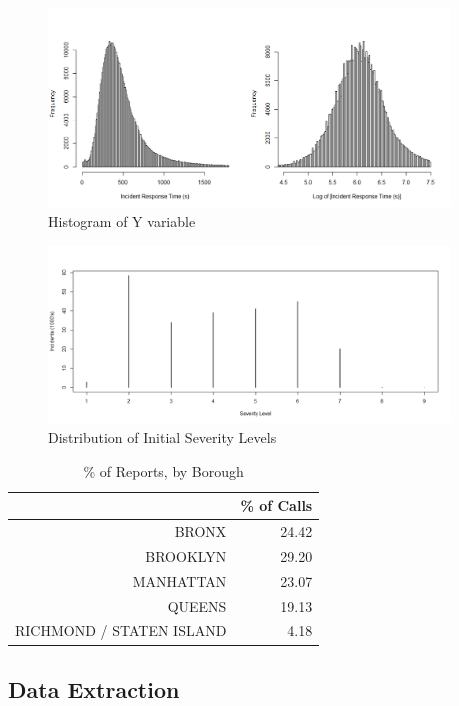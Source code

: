 \documentclass[twoside,11pt]{article}
\begin{document}
\setlength{\tabcolsep}{4pt}

\begin{figure}
    \centering
    \includegraphics[width = 0.95\textwidth]{hist1.png}
    \caption{Histogram of Y variable}
    \label{fig:my_label}
\end{figure}

\begin{figure}
    \centering
    \includegraphics[width = 0.95\textwidth]{severity.png}
    \caption{Distribution of Initial Severity Levels}
\end{figure}

\begin{table}[H]
\centering
\begin{tabular}{rr}
  \hline
 & \% of Calls \\ 
  \hline
BRONX & 24.42 \\ 
  BROOKLYN & 29.20 \\ 
  MANHATTAN & 23.07 \\ 
  QUEENS & 19.13 \\ 
  RICHMOND / STATEN ISLAND & 4.18 \\ 
   \hline
\end{tabular}
\caption{\% of Reports, by Borough} 
\end{table}


\subsection{Data Extraction}
\end{document}
